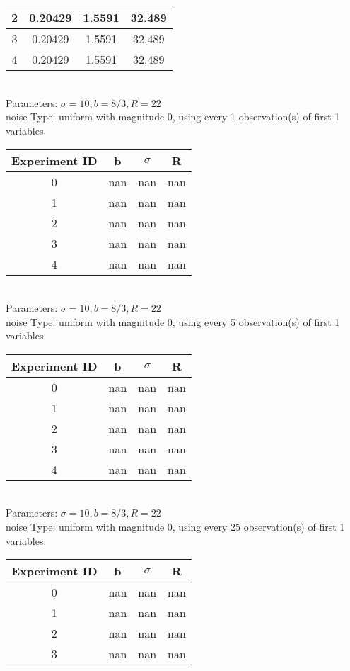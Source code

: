 \begin{multicols}{3}
\begin{tabular}{cccc}
 2 & 0.20429 & 1.5591 & 32.489\\ \hline 
 3 & 0.20429 & 1.5591 & 32.489\\ \hline 
 4 & 0.20429 & 1.5591 & 32.489\\ \hline 
 \end{tabular}\\
Parameters: $\sigma=10, b=8/3, R=22$\\
noise Type: uniform with magnitude 0, using every 1 observation(s) of first 1 variables.\\
\begin{tabular}{cccc}
\hline Experiment ID & b & $\sigma$ & R \\ \hline 
0 & nan & nan & nan\\ \hline 
 1 & nan & nan & nan\\ \hline 
 2 & nan & nan & nan\\ \hline 
 3 & nan & nan & nan\\ \hline 
 4 & nan & nan & nan\\ \hline 
 \end{tabular}\\
Parameters: $\sigma=10, b=8/3, R=22$\\
noise Type: uniform with magnitude 0, using every 5 observation(s) of first 1 variables.\\
\begin{tabular}{cccc}
\hline Experiment ID & b & $\sigma$ & R \\ \hline 
0 & nan & nan & nan\\ \hline 
 1 & nan & nan & nan\\ \hline 
 2 & nan & nan & nan\\ \hline 
 3 & nan & nan & nan\\ \hline 
 4 & nan & nan & nan\\ \hline 
 \end{tabular}\\
Parameters: $\sigma=10, b=8/3, R=22$\\
noise Type: uniform with magnitude 0, using every 25 observation(s) of first 1 variables.\\
\begin{tabular}{cccc}
\hline Experiment ID & b & $\sigma$ & R \\ \hline 
0 & nan & nan & nan\\ \hline 
 1 & nan & nan & nan\\ \hline 
 2 & nan & nan & nan\\ \hline 
 3 & nan & nan & nan\\ \hline 

\end{tabular}
\end{multicols}
